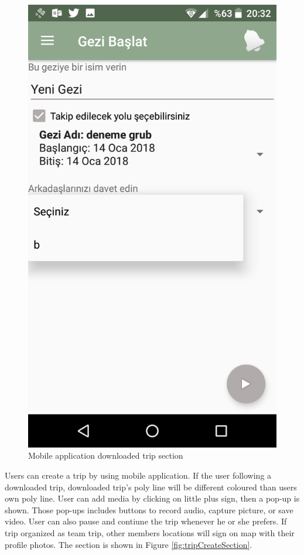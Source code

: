\begin{figure}[!htbp]
\centering
\includegraphics[scale=0.2]{projectChapters/images/downloadedTripManage.png}
\caption{Mobile application downloaded trip section}
\label{fig:downloadedTripManage}
\end{figure}

\newpage

Users can create a trip by using mobile application. If the user following a downloaded trip, downloaded trip's poly line will be different coloured than users own poly line. User can add media by clicking on little plus sign, then a pop-up is shown. Those pop-ups includes buttons to record audio, capture picture, or save video. User can also pause and contiune the trip whenever he or she prefers. If trip organized as team trip, other members locations will sign on map with their profile photos. The section is shown in Figure \ref{fig:tripCreateSection}.

